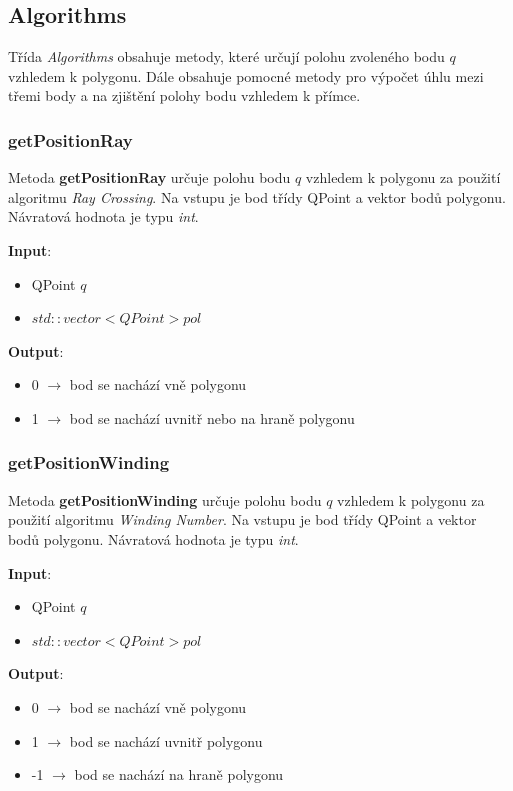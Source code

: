\documentclass[a4paper, 12pt]{article}
\begin{document}
\subsection{Algorithms}
Třída \textsl{Algorithms} obsahuje metody, které určují polohu zvoleného bodu $q$ vzhledem k polygonu. Dále obsahuje pomocné metody pro výpočet úhlu mezi třemi body a na zjištění polohy bodu vzhledem k přímce. 

\subsubsection{getPositionRay}
Metoda \textbf{getPositionRay} určuje polohu bodu $q$ vzhledem k polygonu za použití algoritmu \textsl{Ray Crossing}. Na vstupu je bod třídy QPoint a vektor bodů polygonu. Návratová hodnota je typu \textsl{int}.

\textbf{Input}:
\begin{itemize}
\item QPoint $q$
\item $std::vector<QPoint> pol$
\end{itemize}

\textbf{Output}:
\begin{itemize}
\item 0 $\rightarrow$ bod se nachází vně polygonu
\item 1 $\rightarrow$ bod se nachází uvnitř nebo na hraně polygonu
\end{itemize}

\subsubsection{getPositionWinding}
Metoda \textbf{getPositionWinding} určuje polohu bodu $q$ vzhledem k polygonu za použití algoritmu \textsl{Winding Number}. Na vstupu je bod třídy QPoint a vektor bodů polygonu. Návratová hodnota je typu \textsl{int}.

\textbf{Input}:
\begin{itemize}
\item QPoint $q$
\item $std::vector<QPoint> pol$
\end{itemize}

\textbf{Output}:
\begin{itemize}
\item 0 $\rightarrow$ bod se nachází vně polygonu
\item 1 $\rightarrow$ bod se nachází uvnitř polygonu
\item -1 $\rightarrow$ bod se nachází na hraně polygonu
\end{itemize}
\end{document}
